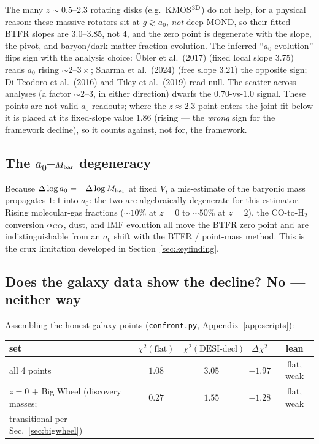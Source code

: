 \documentclass[11pt,a4paper]{article}
\newcommand{\Mbar}{M_{\rm bar}}
\newcommand{\azero}{a_0}
\begin{document}
The many $z\sim0.5$--$2.3$ rotating disks (e.g.\ KMOS$^{3\rm D}$) do not help,
for a physical reason: these massive rotators sit at $g\gtrsim \azero$,
\emph{not} deep-MOND, so their fitted BTFR slopes are $3.0$--$3.85$, not $4$,
and the zero point is degenerate with the slope, the pivot, and
baryon/dark-matter-fraction evolution. The inferred ``$\azero$ evolution''
flips sign with the analysis choice: \"Ubler et al.\ (2017)
\cite{Ubler2017} (fixed local slope $3.75$) reads $\azero$ rising
$\sim2$--$3\times$; Sharma et al.\ (2024) \cite{Sharma2024} (free slope
$3.21$) the opposite sign; Di Teodoro et al.\ (2016) \cite{DiTeodoro2016} and
Tiley et al.\ (2019) \cite{Tiley2019} read null. The scatter across analyses
(a factor $\sim2$--$3$, in either direction) dwarfs the $0.70$-vs-$1.0$
signal. These points are not valid $\azero$ readouts; where the $z\approx2.3$
point enters the joint fit below it is placed at its fixed-slope value $1.86$
(rising --- the \emph{wrong} sign for the framework decline), so it counts
against, not for, the framework.

\subsection{The $a_0$--$M_{\rm bar}$ degeneracy}

Because $\Delta\log \azero=-\Delta\log \Mbar$ at fixed $V$, a mis-estimate of
the baryonic mass propagates $1{:}1$ into $\azero$: the two are algebraically
degenerate for this estimator. Rising molecular-gas fractions ($\sim10\%$ at
$z=0$ to $\sim50\%$ at $z=2$), the CO-to-H$_2$ conversion $\alpha_{\rm CO}$,
dust, and IMF evolution all move the BTFR zero point and are indistinguishable
from an $\azero$ shift with the BTFR / point-mass method. This is the crux
limitation developed in Section~\ref{sec:keyfinding}.

\subsection{Does the galaxy data show the decline? No --- neither way}
\label{sec:confront}

Assembling the honest galaxy points (\texttt{confront.py},
Appendix~\ref{app:scripts}):

\begin{center}
\begin{tabular}{lcccc}
\toprule
set & $\chi^2(\text{flat})$ & $\chi^2(\text{DESI-decl})$ & $\Delta\chi^2$ & lean\\
\midrule
all 4 points & $1.08$ & $3.05$ & $-1.97$ & flat, weak\\
$z=0$ + Big Wheel (discovery masses; & $0.27$ & $1.55$ & $-1.28$ & flat, weak\\
\quad transitional per Sec.~\ref{sec:bigwheel}) & & & &\\
\bottomrule
\end{tabular}
\end{center}
\end{document}
